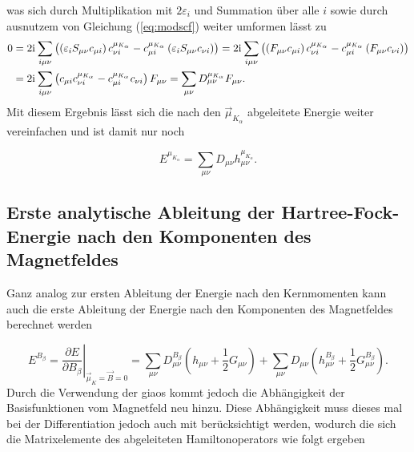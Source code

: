 	was sich durch Multiplikation mit $2\varepsilon_i$ und Summation über alle $i$ sowie durch ausnutzem von Gleichung (\ref{eq:modscf}) weiter umformen lässt zu
	\begin{equation}
	\begin{aligned}
	0&=2\mathrm{i}\mkern1mu\sum_{i\mu\nu}\left(\left(\varepsilon_i S_{\mu\nu} c_{\mu i}\right) c_{\nu i}^{\mu_{K_\alpha}} - c_{\mu i}^{\mu_{K_\alpha}} \left(\varepsilon_i S_{\mu\nu} c_{\nu i}\right)\right)=2\mathrm{i}\mkern1mu\sum_{i\mu\nu}\left(\left(F_{\mu\nu} c_{\mu i}\right) c_{\nu i}^{\mu_{K_\alpha}} - c_{\mu i}^{\mu_{K_\alpha}} \left(F_{\mu\nu} c_{\nu i} \right)\right)\\
	&=2\mathrm{i}\mkern1mu\sum_{i\mu\nu}\left(c_{\mu i}c_{\nu i}^{\mu_{K_\alpha}}-c_{\mu i}^{\mu_{K_\alpha}}c_{\nu i}\right)F_{\mu\nu}=\sum_{\mu\nu}D_{\mu\nu}^{\mu_{K_\alpha}}F_{\mu\nu}.
	\end{aligned}
	\end{equation}
	Mit diesem Ergebnis lässt sich die nach den $\vec{\mu}_{K_\alpha}$ abgeleitete Energie weiter vereinfachen und ist damit nur noch 
	
	\begin{equation}\label{eq:enachmukurz}
	E^{\mu_{K_\alpha}}=\sum_{\mu\nu}D_{\mu\nu}h_{\mu\nu}^{\mu_{K_\alpha}}.
	\end{equation}
	
\subsection{Erste analytische Ableitung der Hartree-Fock-Energie nach den Komponenten des Magnetfeldes}
	
	Ganz analog zur ersten Ableitung der Energie nach den Kernmomenten kann auch die erste Ableitung der Energie nach den Komponenten des Magnetfeldes berechnet werden
	
	\begin{equation}\label{eq:enachb}
  	  E^{B_\beta}=\left.\frac{\partial E}{\partial B_\beta}\right|_{\vec{\mu}_K=\vec{B}=0}=\sum_{\mu\nu}D_{\mu\nu}^{B_\beta}\left(h_{\mu\nu}+\frac{1}{2}G_{\mu\nu}\right)+\sum_{\mu\nu}D_{\mu\nu}\left(h_{\mu\nu}^{B_\beta}+\frac{1}{2}G_{\mu\nu}^{B_\beta}\right).
  	\end{equation}
  	Durch die Verwendung der \acp{giao} kommt jedoch die Abhängigkeit der Basisfunktionen vom Magnetfeld neu hinzu. Diese Abhängigkeit muss dieses mal bei der Differentiation jedoch auch mit berücksichtigt werden, wodurch die sich die Matrixelemente des abgeleiteten Hamiltonoperators wie folgt ergeben
  	
